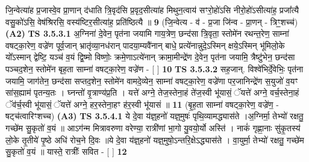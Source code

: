 \documentclass[17pt]{extarticle}
\begin{document}
                  जि॒न्वेत्या॑ह प्र॒जास्वे॒व प्रा॒णान् द॑धाति त्रि॒वृद॑सि प्र॒वृद॒सीत्या॑ह मिथुन॒त्वाय॑ सꣳरो॒हो॑ऽसि नीरो॒हो॑ऽसीत्या॑ह॒ प्रजा᳚त्यै वसु॒को॑ऽसि॒ वेष॑श्रिरसि॒ वस्य॑ष्टिर॒सीत्या॑ह॒ प्रति॑ष्ठित्यै ॥ \textbf{  9} \newline
                  \newline
                      (जि॒न्वेत्य - व॑ - प्र॒जा जि॑न्व - प्रा॒णन् - त्रिꣳ॒॒शच्च॑) \textbf{(A2)} \newline \newline
                                        \textbf{ TS 3.5.3.1} \newline
                  अ॒ग्निना॑ दे॒वेन॒ पृत॑ना जयामि गाय॒त्रेण॒ छन्द॑सा त्रि॒वृता॒ स्तोमे॑न रथन्त॒रेण॒ साम्ना॑ वषट्का॒रेण॒ वज्रे॑ण पूर्व॒जान् भ्रातृ॑व्या॒नध॑रान् पादया॒म्यवै॑नान् बाधे॒ प्रत्ये॑नान्नुदे॒ऽस्मिन् क्षये॒ऽस्मिन् भू॑मिलो॒के यो᳚ऽस्मान् द्वेष्टि॒ यञ्च॑ व॒यं द्वि॒ष्मो विष्णोः॒ क्रमे॒णाऽत्ये॑नान् क्रामा॒मीन्द्रे॑ण दे॒वेन॒ पृत॑ना जयामि॒ त्रैष्टु॑भेन॒ छन्द॑सा पञ्चद॒शेन॒ स्तोमे॑न बृह॒ता साम्ना॑ वषट्का॒रेण॒ वज्रे॑ण - [  ] \textbf{  10} \newline
                  \newline
                                \textbf{ TS 3.5.3.2} \newline
                  सह॒जान्. विश्वे॑भिर्दे॒वेभिः॒ पृत॑ना जयामि॒ जाग॑तेन॒ छन्द॑सा सप्तद॒शेन॒ स्तोमे॑न वामदे॒व्येन॒ साम्ना॑ वषट्का॒रेण॒ वज्रे॑णा पर॒जानिन्द्रे॑ण स॒युजो॑ व॒यꣳ सा॑स॒ह्याम॑ पृतन्य॒तः । घ्नन्तो॑ वृ॒त्राण्य॑प्र॒ति । यत्ते॑ अग्ने॒ तेज॒स्तेना॒हं ते॑ज॒स्वी भू॑यासं॒ ॅयत्ते॑ अग्ने॒ वर्च॒स्तेना॒हं ॅव॑र्च॒स्वी भू॑यासं॒ ॅयत्ते॑ अग्ने॒ हर॒स्तेना॒हꣳ ह॑र॒स्वी भू॑यासं ॥ \textbf{  11} \newline
                  \newline
                      (बृ॒ह॒ता साम्ना॑ वषट्का॒रेण॒ वज्रे॑ण॒ - षट्च॑त्वारिꣳशच्च)  \textbf{(A3)} \newline \newline
                                        \textbf{ TS 3.5.4.1} \newline
                  ये दे॒वा य॑ज्ञ्॒हनो॑ यज्ञ्॒मुषः॑ पृथि॒व्यामद्ध्यास॑ते ।अ॒ग्निर्मा॒ तेभ्यो॑ रक्षतु॒ गच्छे॑म सु॒कृतो॑ व॒यं ॥ आऽग॑न्म मित्रावरुणा वरेण्या॒ रात्री॑णां भा॒गो यु॒वयो॒र्यो अस्ति॑ । नाकं॑ गृह्णा॒नाः सु॑कृ॒तस्य॑ लो॒के तृ॒तीये॑ पृ॒ष्ठे अधि॑ रोच॒ने दि॒वः ॥ये दे॒वा य॑ज्ञ्॒हनो॑ यज्ञ्॒मुषो॒ऽन्तरि॒क्षेऽद्ध्यास॑ते । वा॒युर्मा॒ तेभ्यो॑ रक्षतु॒ गच्छे॑म सु॒कृतो॑ व॒यं ॥ यास्ते॒ रात्रीः᳚ सवित - [  ] \textbf{  12} \newline
                  \newline
\end{document}
